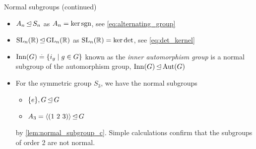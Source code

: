 \begin{ex}{Normal subgroups (continued)}{}
\begin{itemize}
    \item $A_n \operatorname*{\trianglelefteq} S_n$ as $A_n = \ker{\operatorname*{sgn}}$, see \cref{eq:alternating_group}
    \item $\mathrm{SL}_{n}(\mathbb{R}) \operatorname*{\trianglelefteq} \mathrm{GL}_{n}(\mathbb{R})$ as $\mathrm{SL}_{n}(\mathbb{R}) = \ker{\det}$, see \cref{eq:det_kernel}
    \item ${\mathrm{Inn}(G) \overset{.}{=} \{i_g \mid g \in G\}}$ known as the \emph{inner automorphism group} is a normal subgroup of the automorphism group, $\mathrm{Inn}(G) \operatorname*{\trianglelefteq} \mathrm{Aut}(G)$
    \item For the symmetric group $S_3$, we have the normal subgroups \begin{itemize}
        \item $\{e\}, G \operatorname*{\trianglelefteq} G$
        \item $A_3 = \langle (1\ 2\ 3) \rangle \operatorname*{\trianglelefteq} G$
    \end{itemize} by \cref{lem:normal_subgroup_c}. Simple calculations confirm that the subgroups of order 2 are not normal.
\end{itemize}
\end{ex}

